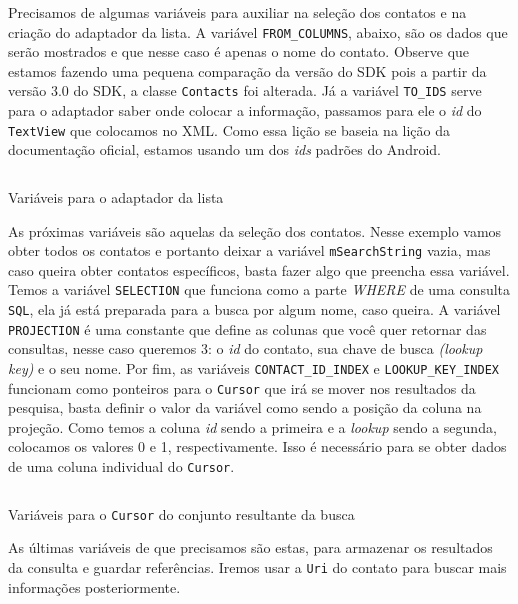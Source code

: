 \documentclass[a4paper,12pt,brazil]{book}
\begin{document}
\begin{singlespace}
	Precisamos de algumas variáveis para auxiliar na seleção dos contatos e na criação do adaptador da lista. A variável \texttt{FROM\_COLUMNS}, abaixo, são os dados que serão mostrados e que nesse caso é apenas o nome do contato. Observe que estamos fazendo uma pequena comparação da versão do SDK pois a partir da versão 3.0 do SDK, a classe \texttt{Contacts} foi alterada. Já a variável \texttt{TO\_IDS} serve para o adaptador saber onde colocar a informação, passamos para ele o \emph{id} do \texttt{TextView} que colocamos no XML. Como essa lição se baseia na lição da documentação oficial, estamos usando um dos \emph{ids} padrões do Android.

		\begin{listing}[H]
		\inputminted[linenos=true,fontsize=\small,frame=lines, framesep=2mm, tabsize=2,numbersep=5pt]{java}{src/api/contacts/fromto.java}
		\caption{Variáveis para o adaptador da lista}
		\label{code:contactadaptervar}
		\end{listing} 	

	As próximas variáveis são aquelas da seleção dos contatos. Nesse exemplo vamos obter todos os contatos e portanto deixar a variável \texttt{mSearchString} vazia, mas caso queira obter contatos específicos, basta fazer algo que preencha essa variável. Temos a variável \texttt{SELECTION} que funciona como a parte \emph{WHERE} de uma consulta \texttt{SQL}, ela já está preparada para a busca por algum nome, caso queira. A variável \texttt{PROJECTION} é uma constante que define as colunas que você quer retornar das consultas, nesse caso queremos 3: o \emph{id} do contato, sua chave de busca \emph{(lookup key)} e o seu nome. Por fim, as variáveis \texttt{CONTACT\_ID\_INDEX} e \texttt{LOOKUP\_KEY\_INDEX} funcionam como ponteiros para o \texttt{Cursor} que irá se mover nos resultados da pesquisa, basta definir o valor da variável como sendo a posição da coluna na projeção. Como temos a coluna \emph{id} sendo a primeira e a \emph{lookup} sendo a segunda, colocamos os valores 0 e 1, respectivamente. Isso é necessário para se obter dados de uma coluna individual do \texttt{Cursor}.

		\begin{listing}[H]
		\inputminted[linenos=true,fontsize=\small,frame=lines, framesep=2mm, tabsize=2,numbersep=5pt]{java}{src/api/contacts/morevar.java}
		\caption{Variáveis para o \texttt{Cursor} do conjunto resultante da busca}
		\label{code:contactcursorvar}
		\end{listing} 	

	As últimas variáveis de que precisamos são estas, para armazenar os resultados da consulta e guardar referências. Iremos usar a \texttt{Uri} do contato para buscar mais informações posteriormente.


\end{singlespace}
\end{document}
